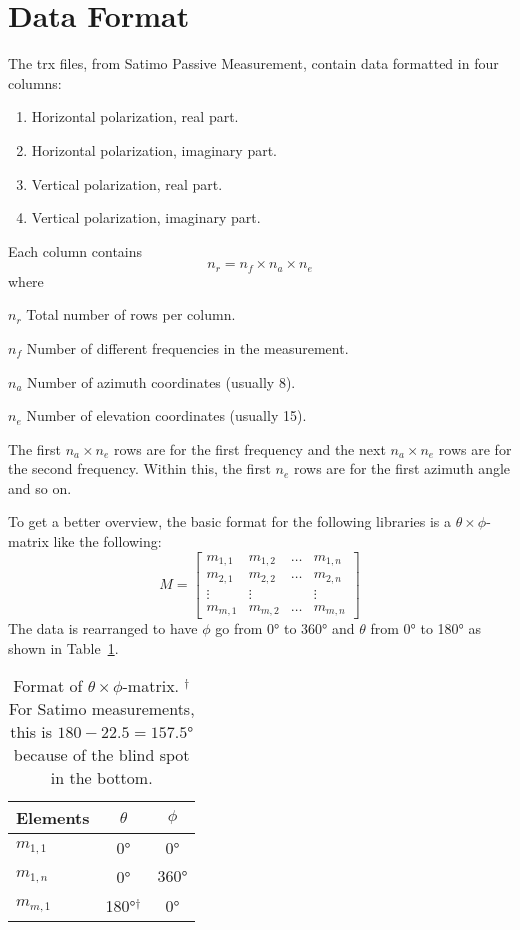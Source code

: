 \section{Data Format}
The trx files, from Satimo Passive Measurement, contain data formatted in four columns:
\begin{enumerate}
    \item Horizontal polarization, real part.
    \item Horizontal polarization, imaginary part.
    \item Vertical polarization, real part.
    \item Vertical polarization, imaginary part.
\end{enumerate}
Each column contains 
\begin{equation}
    n_r =  n_f \times n_a \times n_e
\end{equation}
where
\begin{where}
\item[$n_r$] Total number of rows per column.
\item[$n_f$] Number of different frequencies in the measurement.
\item[$n_a$] Number of azimuth coordinates (usually 8).
\item[$n_e$] Number of elevation coordinates (usually 15).
\end{where}
The first $n_a \times n_e$ rows are for the first frequency and the next $n_a \times n_e$ rows are for the second frequency. Within this, the first $n_e$ rows are for the first azimuth angle and so on.

To get a better overview, the basic format for the following libraries is a $\theta \times \phi$-matrix like the following:
\begin{equation}
    M = \begin{bmatrix}
        m_{1,1} & m_{1,2} & \dots & m_{1,n} \\
        m_{2,1} & m_{2,2} & \dots & m_{2,n} \\
        \vdots & \vdots & & \vdots \\
        m_{m,1} & m_{m,2} & \dots & m_{m,n}
    \end{bmatrix}
\end{equation}
The data is rearranged to have $\phi$ go from \ang{0} to \ang{360} and $\theta$ from \ang{0} to \ang{180} as shown in Table~\ref{tab:matrixformat}.

\begin{table}[htbp]
    \centering
    \begin{tabular}{|l|c|c|}
        \hline
        Elements & $\theta$ & $\phi$ \\
        \hline
        $m_{1,1}$ & \ang{0} & \ang{0} \\
        $m_{1,n}$ & \ang{0} & $\ang{360}$ \\
        $m_{m,1}$ & \ang{180}$^{\dagger}$ & \ang{0} \\
        \hline
    \end{tabular}
    \caption{Format of $\theta\times\phi$-matrix. $^{\dagger}$For Satimo measurements, this is $180-22.5=\ang{157.5}$ because of the blind spot in the bottom.}
    \label{tab:matrixformat}
\end{table}
